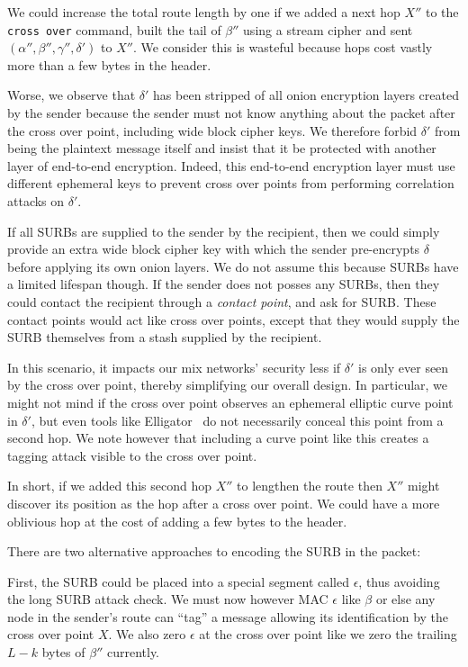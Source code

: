 \smallskip 

We could increase the total route length by one if we added a next
hop $X''$ to the {\tt cross over} command, built the tail of $\beta''$
using a stream cipher and sent $(\alpha'',\beta'',\gamma'',\delta')$
to $X''$. We consider this is wasteful because hops cost vastly more
than a few bytes in the header.

Worse, we observe that $\delta'$ has been stripped of all onion
encryption layers created by the sender because the sender must not
know anything about the packet after the cross over point,
 including wide block cipher keys.
We therefore forbid $\delta'$ from being the plaintext message itself
and insist that it be protected with another layer of end-to-end
encryption.  Indeed, this end-to-end encryption layer must use
different ephemeral keys to prevent cross over points from performing
correlation attacks on $\delta'$.

If all SURBs are supplied to the sender by the recipient, then
we could simply provide an extra wide block cipher key with which
the sender pre-encrypts $\delta$ before applying its own onion layers.
We do not assume this because SURBs have a limited lifespan though.  
If the sender does not posses any SURBs, then they could contact the
recipient through a {\em contact point}, and ask for SURB. 
These contact points would act like cross over points, except
that they would supply the SURB themselves from a stash supplied by
the recipient.

In this scenario, it impacts our mix networks' security less if
$\delta'$ is only ever seen by the cross over point, thereby
simplifying our overall design.   In particular, we might not mind
if the cross over point observes an ephemeral elliptic curve point
in $\delta'$, but even tools like Elligator~\cite{elligator} do not
necessarily conceal this point from a second hop.  We note however
that including a curve point like this creates a tagging attack
visible to the cross over point.

In short, if we added this second hop $X''$ to lengthen the route
then $X''$ might discover its position as the hop after a cross over
point.  We could have a more oblivious hop at the cost of adding a
few bytes to the header.

\smallskip

There are two alternative approaches to encoding the SURB in the 
packet:  

First, the SURB could be placed into a special segment called
$\epsilon$, thus avoiding the long SURB attack check.
We must now however MAC $\epsilon$ like $\beta$ or else any
node in the sender's route can ``tag'' a message allowing its
identification by the cross over point $X$.  We also zero
$\epsilon$ at the cross over point like we zero the trailing
$L-k$ bytes of $\beta''$ currently.  

